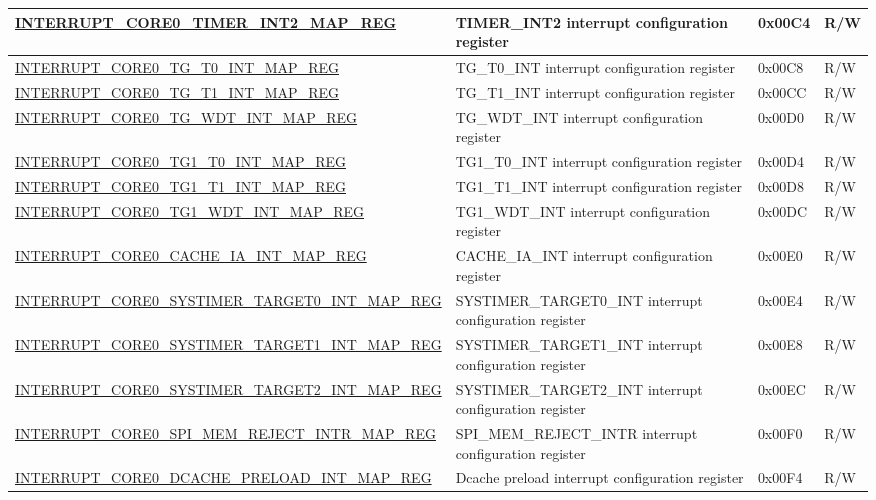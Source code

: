 \begin{landscape}
\begin{longtable}{ | p{10cm} | p{10.2cm} | p{1.3cm} | p{1cm} | }
\hyperref[regdesc:INTERRUPTCORE0TIMERINT2MAPREG]{INTERRUPT\_CORE0\_TIMER\_INT2\_MAP\_REG} & TIMER\_INT2 interrupt configuration register & 0x00C4 & R/W \\ \hline
\hyperref[regdesc:INTERRUPTCORE0TGT0INTMAPREG]{INTERRUPT\_CORE0\_TG\_T0\_INT\_MAP\_REG} & TG\_T0\_INT interrupt configuration register & 0x00C8 & R/W \\ \hline
\hyperref[regdesc:INTERRUPTCORE0TGT1INTMAPREG]{INTERRUPT\_CORE0\_TG\_T1\_INT\_MAP\_REG} & TG\_T1\_INT interrupt configuration register & 0x00CC & R/W \\ \hline
\hyperref[regdesc:INTERRUPTCORE0TGWDTINTMAPREG]{INTERRUPT\_CORE0\_TG\_WDT\_INT\_MAP\_REG} & TG\_WDT\_INT interrupt configuration register & 0x00D0 & R/W \\ \hline
\hyperref[regdesc:INTERRUPTCORE0TG1T0INTMAPREG]{INTERRUPT\_CORE0\_TG1\_T0\_INT\_MAP\_REG} & TG1\_T0\_INT interrupt configuration register & 0x00D4 & R/W \\ \hline
\hyperref[regdesc:INTERRUPTCORE0TG1T1INTMAPREG]{INTERRUPT\_CORE0\_TG1\_T1\_INT\_MAP\_REG} & TG1\_T1\_INT interrupt configuration register & 0x00D8 & R/W \\ \hline
\hyperref[regdesc:INTERRUPTCORE0TG1WDTINTMAPREG]{INTERRUPT\_CORE0\_TG1\_WDT\_INT\_MAP\_REG} & TG1\_WDT\_INT interrupt configuration register & 0x00DC & R/W \\ \hline
\hyperref[regdesc:INTERRUPTCORE0CACHEIAINTMAPREG]{INTERRUPT\_CORE0\_CACHE\_IA\_INT\_MAP\_REG} & CACHE\_IA\_INT interrupt configuration register & 0x00E0 & R/W \\ \hline
\hyperref[regdesc:INTERRUPTCORE0SYSTIMERTARGET0INTMAPREG]{INTERRUPT\_CORE0\_SYSTIMER\_TARGET0\_INT\_MAP\_REG} & SYSTIMER\_TARGET0\_INT interrupt configuration register & 0x00E4 & R/W \\ \hline
\hyperref[regdesc:INTERRUPTCORE0SYSTIMERTARGET1INTMAPREG]{INTERRUPT\_CORE0\_SYSTIMER\_TARGET1\_INT\_MAP\_REG} & SYSTIMER\_TARGET1\_INT interrupt configuration register & 0x00E8 & R/W \\ \hline
\hyperref[regdesc:INTERRUPTCORE0SYSTIMERTARGET2INTMAPREG]{INTERRUPT\_CORE0\_SYSTIMER\_TARGET2\_INT\_MAP\_REG} & SYSTIMER\_TARGET2\_INT interrupt configuration register & 0x00EC & R/W \\ \hline
\hyperref[regdesc:INTERRUPTCORE0SPIMEMREJECTINTRMAPREG]{INTERRUPT\_CORE0\_SPI\_MEM\_REJECT\_INTR\_MAP\_REG} & SPI\_MEM\_REJECT\_INTR interrupt configuration register & 0x00F0 & R/W \\ \hline
\hyperref[regdesc:INTERRUPTCORE0DCACHEPRELOADINTMAPREG]{INTERRUPT\_CORE0\_DCACHE\_PRELOAD\_INT\_MAP\_REG} & Dcache preload interrupt configuration register & 0x00F4 & R/W \\ \hline

\end{longtable}
\end{landscape}
